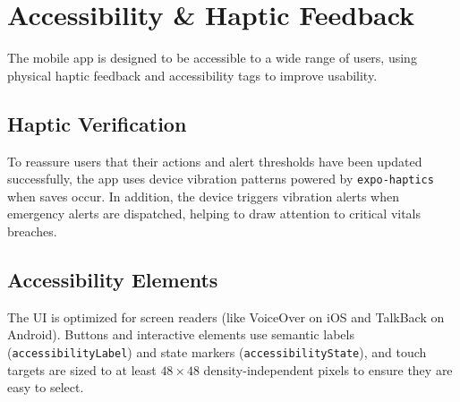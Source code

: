 \section{Accessibility \& Haptic Feedback}
The mobile app is designed to be accessible to a wide range of users, using physical haptic feedback and accessibility tags to improve usability.

\subsection{Haptic Verification}
To reassure users that their actions and alert thresholds have been updated successfully, the app uses device vibration patterns powered by \texttt{expo-haptics} when saves occur. In addition, the device triggers vibration alerts when emergency alerts are dispatched, helping to draw attention to critical vitals breaches.

\subsection{Accessibility Elements}
The UI is optimized for screen readers (like VoiceOver on iOS and TalkBack on Android). Buttons and interactive elements use semantic labels (\texttt{accessibilityLabel}) and state markers (\texttt{accessibilityState}), and touch targets are sized to at least $48 \times 48$ density-independent pixels to ensure they are easy to select.

